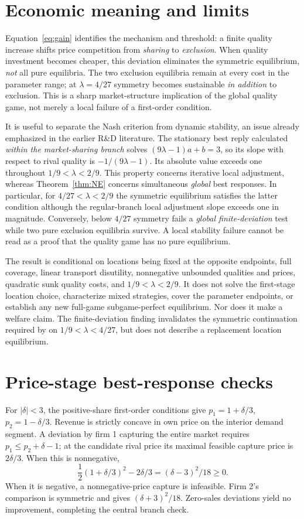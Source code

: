 \documentclass[11pt]{article}
\begin{document}
\section{Economic meaning and limits}\label{sec:discussion}
Equation~\eqref{eq:gain} identifies the mechanism and threshold: a finite quality increase shifts price competition from \emph{sharing} to \emph{exclusion}. When quality investment becomes cheaper, this deviation eliminates the symmetric equilibrium, \emph{not} all pure equilibria. The two exclusion equilibria remain at every cost in the parameter range; at $\lambda=4/27$ symmetry becomes sustainable \emph{in addition} to exclusion. This is a sharp market-structure implication of the global quality game, not merely a local failure of a first-order condition.

It is useful to separate the Nash criterion from dynamic stability, an issue already emphasized in the earlier R\&D literature. The stationary best reply calculated \emph{within the market-sharing branch} solves $(9\lambda-1)a+b=3$, so its slope with respect to rival quality is $-1/(9\lambda-1)$. Its absolute value exceeds one throughout $1/9<\lambda<2/9$. This property concerns iterative local adjustment, whereas Theorem~\ref{thm:NE} concerns simultaneous \emph{global} best responses. In particular, for $4/27<\lambda<2/9$ the symmetric equilibrium satisfies the latter condition although the regular-branch local adjustment slope exceeds one in magnitude. Conversely, below $4/27$ symmetry fails a \emph{global finite-deviation} test while two pure exclusion equilibria survive. A local stability failure cannot be read as a proof that the quality game has no pure equilibrium.

The result is conditional on locations being fixed at the opposite endpoints, full coverage, linear transport disutility, nonnegative unbounded qualities and prices, quadratic sunk quality costs, and $1/9<\lambda<2/9$. It does not solve the first-stage location choice, characterize mixed strategies, cover the parameter endpoints, or establish any new full-game subgame-perfect equilibrium. Nor does it make a welfare claim. The finite-deviation finding invalidates the symmetric continuation required by \citet[Theorem~2]{Economides1989} on $1/9<\lambda<4/27$, but does not describe a replacement location equilibrium.

\appendix
\section{Price-stage best-response checks}\label{app:price}
For $|\delta|<3$, the positive-share first-order conditions give $p_1=1+\delta/3$, $p_2=1-\delta/3$. Revenue is strictly concave in own price on the interior demand segment. A deviation by firm 1 capturing the entire market requires $p_1\le p_2+\delta-1$; at the candidate rival price its maximal feasible capture price is $2\delta/3$. When this is nonnegative,
\[
\frac12(1+\delta/3)^2-2\delta/3=(\delta-3)^2/18\ge0.
\]
When it is negative, a nonnegative-price capture is infeasible. Firm 2's comparison is symmetric and gives $(\delta+3)^2/18$. Zero-sales deviations yield no improvement, completing the central branch check.
\end{document}
